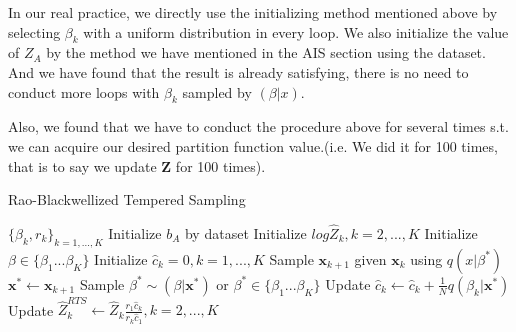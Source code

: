 In our real practice, we directly use the initializing method mentioned above by selecting $\beta_{k}$ with a uniform distribution in every loop. We also initialize the value of $Z_{A}$ by the method we have mentioned in the AIS section using the dataset. And we have found that the result is already satisfying, there is no need to conduct more loops with $\beta_{k}$ sampled by $(\beta|x)$.

Also, we found that we have to conduct the procedure above for several times s.t. we can acquire our desired partition function value.(i.e. We did it for 100 times, that is to say we update $\mathbf Z$ for 100 times).

	\begin{algorithm}
        \caption{Rao-Blackwellized Tempered Sampling}
        \begin{algorithmic}
        	\Require $\{\beta_{k},r_{k}\}_{k=1,...,K}$
            \State Initialize $b_{A}$ by dataset
        	\State Initialize $log \hat{Z}_{k}, k=2,...,K$ 
            	\State Initialize $\beta \in \{\beta_{1}...\beta_{K}\}$
            	\State Initialize $\hat{c}_{k}=0, k=1,...,K$
                        \State Sample $\mathbf x_{k+1}$ given $\mathbf x_{k}$ using $q(x|\beta^{*})$
                    \EndFor
                    \State $\mathbf x^{*} \gets \mathbf x_{k+1}$
    	            \State Sample $\beta^{*} \sim (\beta|\mathbf x^{*})$ or $\beta^{*} \in \{\beta_{1}...\beta_{K}\}$
    	            \State Update $\hat{c}_{k} \gets \hat{c}_{k}+\frac{1}{N} q(\beta_{k}|\mathbf x^{*})$
    			\EndFor
                \State Update $\hat{Z}^{RTS}_{k} \gets \hat{Z}_{k}\frac{r_{1}\hat{c}_{k}}{r_{k}\hat{c}_{1}}, k=2,...,K$
            \EndFor
        \end{algorithmic}
    \end{algorithm}
